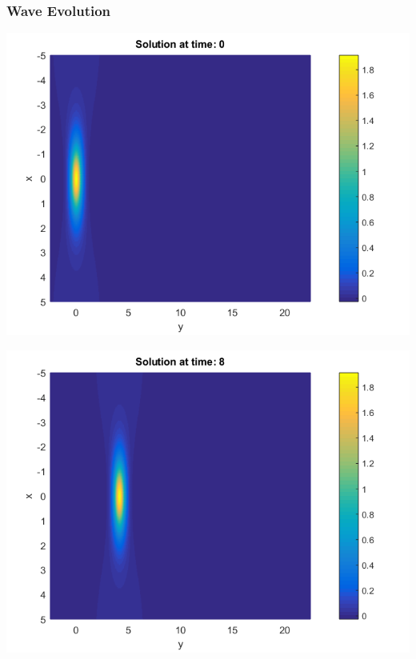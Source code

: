 \documentclass{beamer}
\begin{document}
\begin{frame}
\frametitle{Wave Evolution}
\begin{center}\vspace{0.4cm}
	\begin{minipage}[b]{0.30\linewidth}
		\includegraphics[width=\linewidth]{../amitans/figures/Solution_bt3_t=0.png}
	\end{minipage}	
	\begin{minipage}[b]{0.30\linewidth}
		\includegraphics[width=\linewidth]{../amitans/figures/Solution_bt3_t=8.png}
	\end{minipage}	
	\begin{minipage}[b]{0.30\linewidth}

\end{minipage}
\end{center}
\end{frame}
\end{document}
